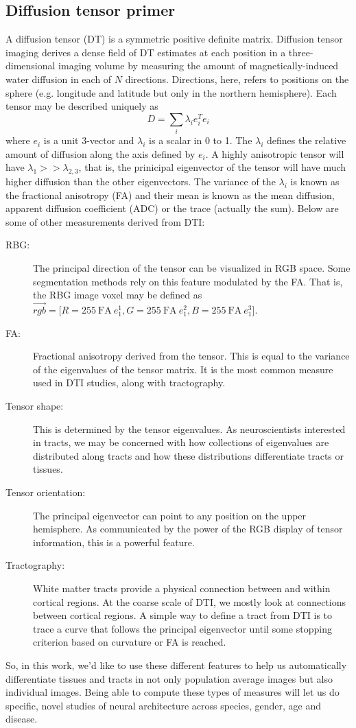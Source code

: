 \documentclass[11pt,english]{article}
\begin{document}
\subsection{Diffusion tensor primer} A diffusion tensor (DT) is a
symmetric positive definite matrix.  Diffusion tensor imaging derives
a dense field of DT estimates at each position in a three-dimensional
imaging volume by measuring the amount of magnetically-induced water
diffusion in each of $N$ directions.  Directions, here, refers to
positions on the sphere (e.g. longitude and latitude but only in the
northern hemisphere).  Each tensor may be described uniquely as
$$D=\sum_i \lambda_i e_i^T e_i $$ where $e_i$ is a unit 3-vector and
$\lambda_i$ is a scalar in 0 to 1.  The $\lambda_i$ defines the
relative amount of diffusion along the axis defined by $e_i$.  A
highly anisotropic tensor will have $\lambda_1 >> \lambda_{2,3} $, that
is, the prinicipal eigenvector of the tensor will have much higher
diffusion than the other eigenvectors.   The variance of the
$\lambda_i$ is known as the fractional anisotropy (FA) and their mean is
known as the mean diffusion, apparent diffusion coefficient (ADC) or
the trace (actually the sum). Below are some of other measurements derived from DTI:
\begin{description}
\item[RBG:] The principal direction of the tensor can be visualized in
  RGB space.  Some segmentation methods rely on this feature 
  modulated by the FA.  That is, the RBG image voxel may be defined as
  $\vec{rgb}=[R=255~\text{FA}~e_1^1, G=255~\text{FA}~e_1^2, B=255~\text{FA}~e_1^3$].
\item[FA:] Fractional anisotropy derived from the tensor.  This is
  equal to the variance of the eigenvalues of the tensor matrix.  It
  is the most common measure used in DTI studies, along with
  tractography. 
\item[Tensor shape:]  This is determined by the tensor eigenvalues.  As
  neuroscientists interested in tracts, we may be concerned with how
  collections of eigenvalues are distributed along tracts and how
  these distributions differentiate tracts or tissues.
\item[Tensor orientation:] The principal
  eigenvector can point to any position on the upper hemisphere.  As
  communicated by the power of the RGB display of tensor information,
  this is a powerful feature. 
\item[Tractography:] White matter tracts provide a physical connection
  between and within cortical regions.  At the coarse scale of DTI, we mostly
  look at connections between cortical regions.  A simple way to
  define a tract from DTI is to trace a curve that follows the principal eigenvector until
  some stopping criterion based on curvature or FA is reached. 
\end{description}
So, in this work, we'd like to use these different features to help us
automatically differentiate tissues and tracts in not only population
average images but also individual images.  Being able to compute
these types of measures will let us do specific, novel studies of
neural architecture across species, gender, age and disease.
\end{document}
